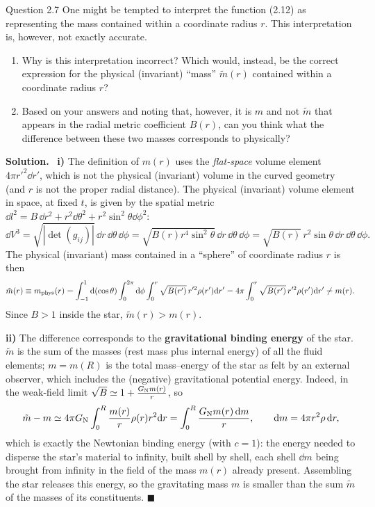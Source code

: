 \documentclass[11pt,a4paper]{article}
\numberwithin{equation}{subsection}
\newenvironment{solution}{\par\noindent\textbf{\textcolor{excol!70!black}{Solution.}}\ }{\hfill$\blacksquare$\par\medskip}
\newcommand{\added}[1]{{\color{teal!60!black}#1}}
\begin{document}
\begin{problem}{Question 2.7}
One might be tempted to interpret the function (2.12) as representing the mass contained within a coordinate radius $r$. This interpretation is, however, not exactly accurate.
\begin{enumerate}[label=\roman*)]
\item Why is this interpretation incorrect? Which would, instead, be the correct expression for the physical (invariant) ``mass'' $\tilde m(r)$ contained within a coordinate radius $r$?
\item Based on your answers and noting that, however, it is $m$ and not $\tilde m$ that appears in the radial metric coefficient $B(r)$, can you think what the difference between these two masses corresponds to physically?
\end{enumerate}
\end{problem}
\begin{solution}
\textbf{i)} The definition of $m(r)$ uses the \emph{flat-space} volume element $4\pi r'^2\dd r'$, which is not the physical (invariant) volume in the curved geometry \added{(and $r$ is not the proper radial distance)}. The physical (invariant) volume element in space, at fixed $t$, is given by the spatial metric $\dd l^2=B\,\dd r^2+r^2\dd\theta^2+r^2\sin^2\theta\dd\phi^2$:
\[
  \dd V^3=\sqrt{|\det(g_{ij})|}\,\dd r\,\dd\theta\,\dd\phi=\sqrt{B(r)r^4\sin^2\theta}\,\dd r\,\dd\theta\,\dd\phi=\sqrt{B(r)}\,r^2\sin\theta\,\dd r\,\dd\theta\,\dd\phi .
\]
The physical (invariant) mass contained in a ``sphere'' of coordinate radius $r$ is then
\[
  \tilde m(r)\equiv m_{\rm phys}(r)=\int_{-1}^{1}\mathrm{d}(\cos\theta)\int_0^{2\pi}\mathrm{d}\phi\int_0^r\sqrt{B(r')}\,r'^2\rho(r')\mathrm{d} r'=4\pi\int_0^r\sqrt{B(r')}\,r'^2\rho(r')\mathrm{d} r'\neq m(r).
\]
Since $B>1$ inside the star, $\tilde m(r)>m(r)$.

\textbf{ii)} The difference corresponds to the \textbf{gravitational binding energy} of the star. $\tilde m$ is the sum of the masses (rest mass plus internal energy) of all the fluid elements; $m=m(R)$ is the total mass--energy of the star as felt by an external observer, which includes the (negative) gravitational potential energy. \added{Indeed, in the weak-field limit $\sqrt B\simeq1+\frac{G_{\mathrm N} m(r)}{r}$, so
\[
  \tilde m-m\simeq4\pi G_{\mathrm N}\int_0^R\frac{m(r)}{r}\rho(r)r^2\mathrm{d} r=\int_0^R\frac{G_{\mathrm N} m(r)\,\mathrm{d} m}{r},\qquad\mathrm{d} m=4\pi r^2\rho\,\mathrm{d} r,
\]
which is exactly the Newtonian binding energy (with $c=1$): the energy needed to disperse the star's material to infinity, built shell by shell, each shell $\dd m$ being brought from infinity in the field of the mass $m(r)$ already present. Assembling the star releases this energy, so the gravitating mass $m$ is smaller than the sum $\tilde m$ of the masses of its constituents.}
\end{solution}
\end{document}
